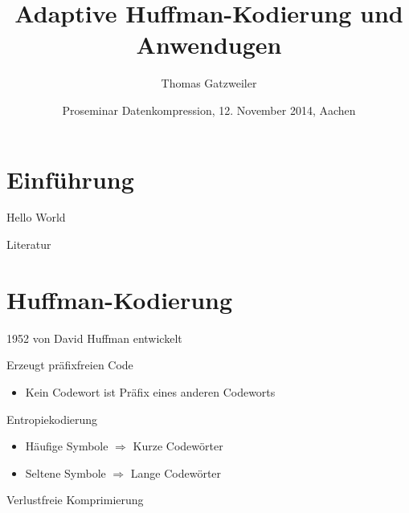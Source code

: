 \documentclass[xcolor=table,presentation]{beamer}    %
\title[Adaptive Huffman-Kodierung und Anwendungen]{Adaptive Huffman-Kodierung und Anwendugen}
\author[Gatzweiler]{Thomas Gatzweiler}
\institute[RWTH Aachen University] %
{
  \strut Human Language Technology and Pattern Recognition\\
  \strut Computer Science Department, RWTH Aachen University %
}
\date[12. November 2014]{Proseminar Datenkompression, 12. November 2014, Aachen}
\newenvironment{witemize}{\itemize\setlength{\itemsep}{0.5em}}{\enditemize}
\begin{document}
\nocite{*}

\begin{frame}[label=titlepage]
  \titlepage
\end{frame}


%


\section{Einführung} \label{sec:intro}
\begin{frame}{\insertsection}
Hello World
\end{frame}


\begin{frame}[allowframebreaks]{Literatur}
 
 
\end{frame}


\section{Huffman-Kodierung}

\begin{frame}[<+->]{\insertsection}
  \begin{witemize}
    \item 1952 von David Huffman entwickelt
    \item Erzeugt präfixfreien Code
      \begin{itemize}
        \item{Kein Codewort ist Präfix eines anderen Codeworts}
      \end{itemize}
    \item Entropiekodierung
      \begin{itemize}
        \item Häufige Symbole $\Rightarrow$ Kurze Codewörter
        \item Seltene Symbole $\Rightarrow$ Lange Codewörter
      \end{itemize}
    \item Verlustfreie Komprimierung
  \end{witemize}
\end{frame}
\end{document}
